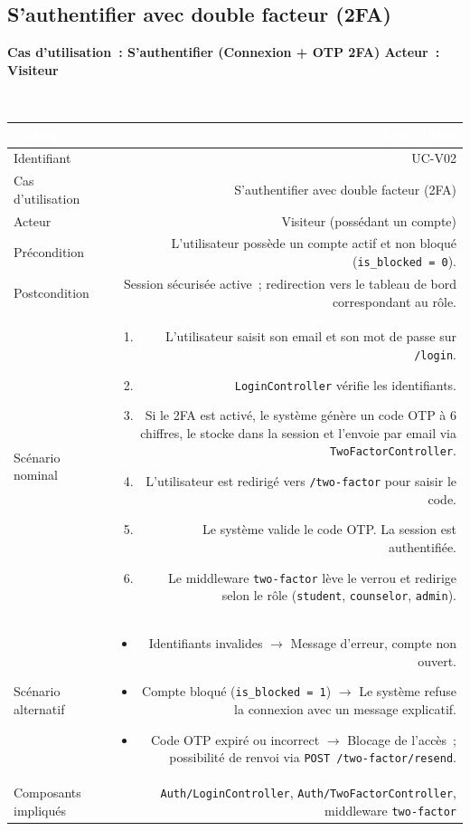 \documentclass[a4paper,12pt]{article}
\newcommand{\ucheader}[2]{%
  \noindent\colorbox{capblue}{\parbox{\dimexpr\linewidth-2\fboxsep}{%
    \color{white}\bfseries\large Cas d'utilisation~: #1 \hfill \normalsize Acteur~: #2
  }}\\[2pt]
}
\begin{document}
\vspace{1em}

\subsection{S'authentifier avec double facteur (2FA)}
\ucheader{S'authentifier (Connexion + OTP 2FA)}{Visiteur}

\noindent
\begin{tabular}{|L|R|}
\hline
{}\textcolor{white}{\textbf{Champ}} & \textcolor{white}{\textbf{Description}} \\
\hline
{}Identifiant & UC-V02 \\
\hline
Cas d'utilisation & S'authentifier avec double facteur (2FA) \\
\hline
{}Acteur & Visiteur (possédant un compte) \\
\hline
Précondition & L'utilisateur possède un compte actif et non bloqué (\texttt{is\_blocked = 0}). \\
\hline
{}Postcondition & Session sécurisée active~; redirection vers le tableau de bord correspondant au rôle. \\
\hline
Scénario nominal &
\begin{enumerate}
  \item L'utilisateur saisit son email et son mot de passe sur \texttt{/login}.
  \item \texttt{LoginController} vérifie les identifiants.
  \item Si le 2FA est activé, le système génère un code OTP à 6 chiffres, le stocke dans la session et l'envoie par email via \texttt{TwoFactorController}.
  \item L'utilisateur est redirigé vers \texttt{/two-factor} pour saisir le code.
  \item Le système valide le code OTP. La session est authentifiée.
  \item Le middleware \texttt{two-factor} lève le verrou et redirige selon le rôle (\texttt{student}, \texttt{counselor}, \texttt{admin}).
\end{enumerate} \\
\hline
{}Scénario alternatif &
\begin{itemize}
  \item Identifiants invalides $\rightarrow$ Message d'erreur, compte non ouvert.
  \item Compte bloqué (\texttt{is\_blocked = 1}) $\rightarrow$ Le système refuse la connexion avec un message explicatif.
  \item Code OTP expiré ou incorrect $\rightarrow$ Blocage de l'accès~; possibilité de renvoi via \texttt{POST /two-factor/resend}.
\end{itemize} \\
\hline
Composants impliqués & \texttt{Auth/LoginController}, \texttt{Auth/TwoFactorController}, middleware \texttt{two-factor} \\
\hline
\end{tabular}
\end{document}
